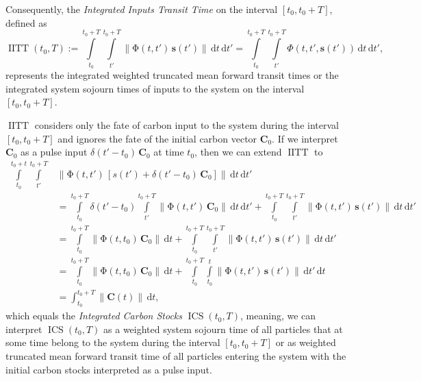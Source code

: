\documentclass[9pt,twoside,lineno]{pnas-new_SI}
\newcommand{\IITT}{\operatorname{IITT}}
\newcommand{\ICS}{\operatorname{ICS}}
\newcommand{\intl}{\int\limits}
\newcommand{\dd}[1]{\,\mathrm{d}#1}
\renewcommand{\vec}[1]{\mathbf{#1}}
\newcommand{\tens}[1]{\mathrm{#1}}
\newcommand{\itPhi}{\mathit{\Phi}}
\newcommand{\vnorm}[1]{\left\|#1\right\|}
\begin{document}
Consequently, the \emph{Integrated Inputs Transit Time} on the interval $[t_0, t_0+T]$, defined as
\begin{equation}
    \label{eqn:IITT}
    \IITT(t_0, T) := \intl_{t_0}^{t_0+T} \intl_{t'}^{t_0+T} \vnorm{\tens{\Phi}(t,t')\,\vec{s}(t')}\dd{t}\dd{t'} = \intl_{t_0}^{t_0+T} \intl_{t'}^{t_0+T} \itPhi(t,t',\vec{s}(t'))\dd{t}\dd{t'},
\end{equation}
represents the integrated weighted truncated mean forward transit times or the integrated system sojourn times of inputs to the system on the interval $[t_0, t_0+T]$.

$\IITT$ considers only the fate of carbon input to the system during the interval $[t_0,t_0+T]$ and ignores the fate of the initial carbon vector $\vec{C}_0$.
If we interpret $\vec{C}_0$ as a pulse input $\delta(t'-t_0)\,\vec{C}_0$ at time $t_0$, then we can extend $\IITT$ to
\begin{equation}
    \label{eqn:ICS}
    \begin{aligned}
        \intl_{t_0}^{t_0+t} \intl_{t'}^{t_0+T} &\vnorm{\tens{\Phi}(t,t')\,\left[s(t') + \delta(t'-t_0)\,\vec{C}_0\right]}\dd{t}\dd{t'} \\
        &=\intl_{t_0}^{t_0+T} \delta(t'-t_0) \intl_{t'}^{t_0+T}\vnorm{\tens{\Phi}(t,t')\,\vec{C}_0}\dd{t}\dd{t'} + \intl_{t_0}^{t_0+T}\intl_{t'}^{t_0+T}\vnorm{\tens{\Phi}(t,t')\,\vec{s}(t')}\dd{t}\dd{t'}\\
        &= \intl_{t_0}^{t_0+T}\vnorm{\tens{\Phi}(t,t_0)\,\vec{C}_0}\dd{t} +\intl_{t_0}^{t_0+T}\intl_{t'}^{t_0+T}\vnorm{\tens{\Phi}(t,t')\,\vec{s}(t')}\dd{t}\dd{t'}\\
        & = \intl_{t_0}^{t_0+T}\vnorm{\tens{\Phi}(t,t_0)\,\vec{C}_0}\dd{t} + \intl_{t_0}^{t_0+T} \intl_{t_0}^t \vnorm{\tens{\Phi}(t,t')\,\vec{s}(t')}\dd{t'}\dd{t}\\
        &= \int_{t_0}^{t_0+T} \vnorm{\vec{C}(t)}\dd{t},
    \end{aligned}
\end{equation}
which equals the \emph{Integrated Carbon Stocks} $\ICS(t_0,T)$, meaning, we can interpret $\ICS(t_0, T)$ as a weighted system sojourn time of all particles that at some time belong to the system during the interval $[t_0,t_0+T]$ or as weighted truncated mean forward transit time of all particles entering the system with the initial carbon stocks interpreted as a pulse input.
\end{document}
